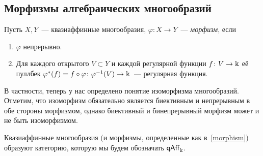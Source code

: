 	\subsection{Морфизмы алгебраических многообразий}\hypertarget{bilet_5}{}
	
	\begin{definition}\label{morphism} 
		Пусть $X, Y$~--- квазиаффинные многообразия, $\varphi\colon X \to Y$~--- \emph{морфизм}, если
		\begin{enumerate}
			\item $\varphi$ непрерывно. 
			\item Для каждого открытого $V \subset Y$ и каждой регулярной функции $f\colon V \to \Bbbk$ её пуллбек $\varphi^*(f) = f \circ \varphi\colon \varphi^{-1}(V) \to \Bbbk$~--- регулярная функция. 
		\end{enumerate}
	\end{definition}

	\begin{remark}
		В частности, теперь у нас определено понятие изоморфизма многообразий. Отметим, что изоморфизм обязательно является биективным и непрерывным в обе стороны морфизмом, однако биективный и бинепрерывный морфизм может и не быть изоморфизмом. 
	\end{remark}

	\begin{statement} 
		Квазиаффинные многообразия (и морфизмы, определенные как в~\ref{morphism}) образуют категорию, которую мы будем обозначать $\mathsf{qAff}_{\Bbbk}$.
	\end{statement}

